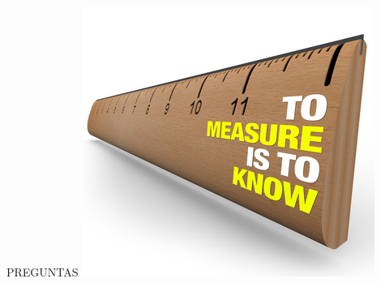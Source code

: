 \documentclass{beamer}
\begin{document}
\begin{frame}

\LARGE{PREGUNTAS}
\includegraphics[scale=0.5]{measure.jpg} 
\end{frame}
\end{document}
